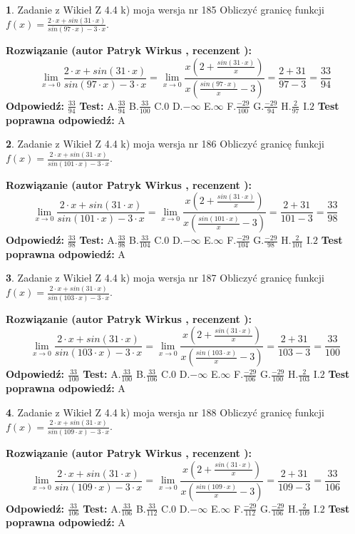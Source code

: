 \documentclass[12pt, a4paper]{article}
\theoremstyle{definition} %
\newtheorem{zad}{}
\newcommand{\zadStart}[1]{\begin{zad}#1\newline}
\newcommand{\zadStop}{\end{zad}}
\newcommand{\rozwStart}[2]{\noindent \textbf{Rozwiązanie (autor #1 , recenzent #2): }\newline}
\newcommand{\rozwStop}{\newline}
\newcommand{\odpStart}{\noindent \textbf{Odpowiedź:}\newline}
\newcommand{\odpStop}{\newline}
\newcommand{\testStart}{\noindent \textbf{Test:}\newline}
\newcommand{\testStop}{\newline}
\newcommand{\kluczStart}{\noindent \textbf{Test poprawna odpowiedź:}\newline}
\newcommand{\kluczStop}{\newline}
\begin{document}
\zadStart{Zadanie z Wikieł Z 4.4 k) moja wersja nr 185}
Obliczyć granicę funkcji $f(x)=\frac{2\cdot x +sin(31\cdot x)}{sin(97\cdot x) -3\cdot x}$.
\zadStop
\rozwStart{Patryk Wirkus}{}
$$\lim\limits_{x\to 0}\frac{2\cdot x +sin(31\cdot x)}{sin(97\cdot x) -3\cdot x}
=\lim\limits_{x\to 0}\frac{x(2+\frac{sin(31\cdot x)}{x})}{x(\frac{sin(97\cdot x)}{x}-3)}
=\frac{2+31}{97-3} = \frac{33}{94}$$
\rozwStop
\odpStart
$\frac{33}{94}$
\odpStop
\testStart
A.$\frac{33}{94}$
B.$\frac{33}{100}$
C.$0$
D.$-\infty$
E.$\infty$
F.$\frac{-29}{100}$
G.$\frac{-29}{94}$
H.$\frac{2}{97}$
I.$2$
\testStop
\kluczStart
A
\kluczStop



\zadStart{Zadanie z Wikieł Z 4.4 k) moja wersja nr 186}
Obliczyć granicę funkcji $f(x)=\frac{2\cdot x +sin(31\cdot x)}{sin(101\cdot x) -3\cdot x}$.
\zadStop
\rozwStart{Patryk Wirkus}{}
$$\lim\limits_{x\to 0}\frac{2\cdot x +sin(31\cdot x)}{sin(101\cdot x) -3\cdot x}
=\lim\limits_{x\to 0}\frac{x(2+\frac{sin(31\cdot x)}{x})}{x(\frac{sin(101\cdot x)}{x}-3)}
=\frac{2+31}{101-3} = \frac{33}{98}$$
\rozwStop
\odpStart
$\frac{33}{98}$
\odpStop
\testStart
A.$\frac{33}{98}$
B.$\frac{33}{104}$
C.$0$
D.$-\infty$
E.$\infty$
F.$\frac{-29}{104}$
G.$\frac{-29}{98}$
H.$\frac{2}{101}$
I.$2$
\testStop
\kluczStart
A
\kluczStop



\zadStart{Zadanie z Wikieł Z 4.4 k) moja wersja nr 187}
Obliczyć granicę funkcji $f(x)=\frac{2\cdot x +sin(31\cdot x)}{sin(103\cdot x) -3\cdot x}$.
\zadStop
\rozwStart{Patryk Wirkus}{}
$$\lim\limits_{x\to 0}\frac{2\cdot x +sin(31\cdot x)}{sin(103\cdot x) -3\cdot x}
=\lim\limits_{x\to 0}\frac{x(2+\frac{sin(31\cdot x)}{x})}{x(\frac{sin(103\cdot x)}{x}-3)}
=\frac{2+31}{103-3} = \frac{33}{100}$$
\rozwStop
\odpStart
$\frac{33}{100}$
\odpStop
\testStart
A.$\frac{33}{100}$
B.$\frac{33}{106}$
C.$0$
D.$-\infty$
E.$\infty$
F.$\frac{-29}{106}$
G.$\frac{-29}{100}$
H.$\frac{2}{103}$
I.$2$
\testStop
\kluczStart
A
\kluczStop



\zadStart{Zadanie z Wikieł Z 4.4 k) moja wersja nr 188}
Obliczyć granicę funkcji $f(x)=\frac{2\cdot x +sin(31\cdot x)}{sin(109\cdot x) -3\cdot x}$.
\zadStop
\rozwStart{Patryk Wirkus}{}
$$\lim\limits_{x\to 0}\frac{2\cdot x +sin(31\cdot x)}{sin(109\cdot x) -3\cdot x}
=\lim\limits_{x\to 0}\frac{x(2+\frac{sin(31\cdot x)}{x})}{x(\frac{sin(109\cdot x)}{x}-3)}
=\frac{2+31}{109-3} = \frac{33}{106}$$
\rozwStop
\odpStart
$\frac{33}{106}$
\odpStop
\testStart
A.$\frac{33}{106}$
B.$\frac{33}{112}$
C.$0$
D.$-\infty$
E.$\infty$
F.$\frac{-29}{112}$
G.$\frac{-29}{106}$
H.$\frac{2}{109}$
I.$2$
\testStop
\kluczStart
A
\kluczStop
\end{document}
